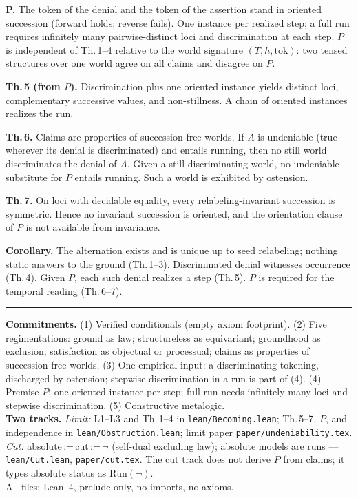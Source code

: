 \documentclass[11pt]{article}
\newcommand{\lf}[1]{\texttt{#1}}
\begin{document}
\textbf{P.} The token of the denial and the token of the assertion stand in oriented
succession (forward holds; reverse fails). One instance per realized step; a full run
requires infinitely many pairwise-distinct loci and discrimination at each step. $P$ is
independent of Th.\,1--4 relative to the world signature $(T,h,\mathrm{tok})$: two tensed
structures over one world agree on all claims and disagree on $P$.

\textbf{Th.\,5 (from $P$).} Discrimination plus one oriented instance yields distinct loci,
complementary successive values, and non-stillness. A chain of oriented instances realizes
the run.

\textbf{Th.\,6.} Claims are properties of succession-free worlds. If $A$ is undeniable
(true wherever its denial is discriminated) and entails running, then no still world
discriminates the denial of $A$. Given a still discriminating world, no undeniable substitute
for $P$ entails running. Such a world is exhibited by ostension.

\textbf{Th.\,7.} On loci with decidable equality, every relabeling-invariant succession is
symmetric. Hence no invariant succession is oriented, and the orientation clause of $P$ is
not available from invariance.

\textbf{Corollary.} The alternation exists and is unique up to seed relabeling; nothing
static answers to the ground (Th.\,1--3). Discriminated denial witnesses occurrence
(Th.\,4). Given $P$, each such denial realizes a step (Th.\,5). $P$ is required for the
temporal reading (Th.\,6--7).

\vspace{4pt}
\begin{center}\rule{0.4\textwidth}{0.3pt}\end{center}
\vspace{2pt}

{\small\noindent
\textbf{Commitments.}
(1) Verified conditionals (empty axiom footprint).
(2) Five regimentations: ground as law; structureless as equivariant; groundhood as
exclusion; satisfaction as objectual or processual; claims as properties of
succession-free worlds.
(3) One empirical input: a discriminating tokening, discharged by ostension; stepwise
discrimination in a run is part of (4).
(4) Premise $P$: one oriented instance per step; full run needs infinitely many loci and
stepwise discrimination.
(5) Constructive metalogic.\\[2pt]
\textbf{Two tracks.}
\emph{Limit:} L1--L3 and Th.\,1--4 in \lf{lean/Becoming.lean}; Th.\,5--7, $P$, and
independence in \lf{lean/Obstruction.lean}; limit paper \lf{paper/undeniability.tex}.
\emph{Cut:} absolute\,:=\,cut\,:=\,$\lnot$ (self-dual excluding law); absolute models are
runs --- \lf{lean/Cut.lean}, \lf{paper/cut.tex}. The cut track does not derive $P$ from
claims; it types absolute status as $\mathrm{Run}(\lnot)$.\\[2pt]
All files: Lean~4, prelude only, no imports, no axioms.}
\end{document}
